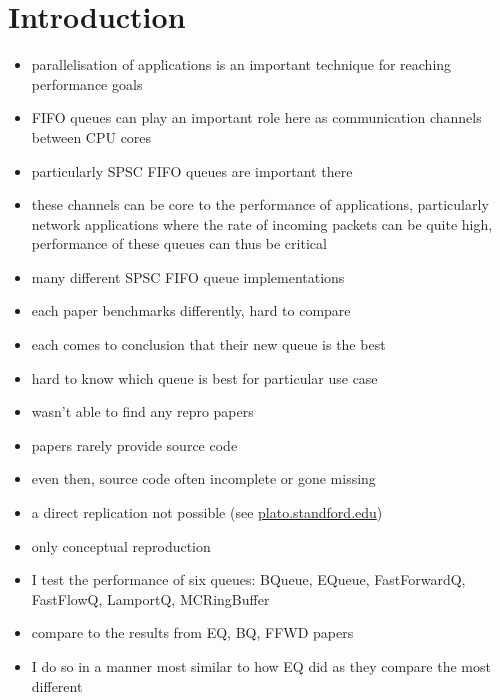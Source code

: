 \section{Introduction}
\begin{itemize}
    \item parallelisation of applications is an important technique for reaching performance goals
    \item FIFO queues can play an important role here as communication channels between CPU cores
    \item particularly SPSC FIFO queues are important there
    \item these channels can be core to the performance of applications, particularly network applications
        where the rate of incoming packets can be quite high, performance of these queues can thus be critical
    \item many different SPSC FIFO queue implementations
    \item each paper benchmarks differently, hard to compare
    \item each comes to conclusion that their new queue is the best
    \item hard to know which queue is best for particular use case
    \item wasn't able to find any repro papers 
    \item papers rarely provide source code
    \item even then, source code often incomplete or gone missing
    \item a direct replication not possible (see
            \href{https://plato.stanford.edu/entries/scientific-reproducibility/#:~:text=direct
                replication%
                conceptual%
                to%
        }{plato.standford.edu})
    \item only conceptual reproduction
    \item I test the performance of six queues: BQueue, EQueue, FastForwardQ, FastFlowQ, LamportQ, MCRingBuffer
    \item compare to the results from EQ, BQ, FFWD papers
    \item I do so in a manner most similar to how EQ did as they compare the most different

\end{itemize}
